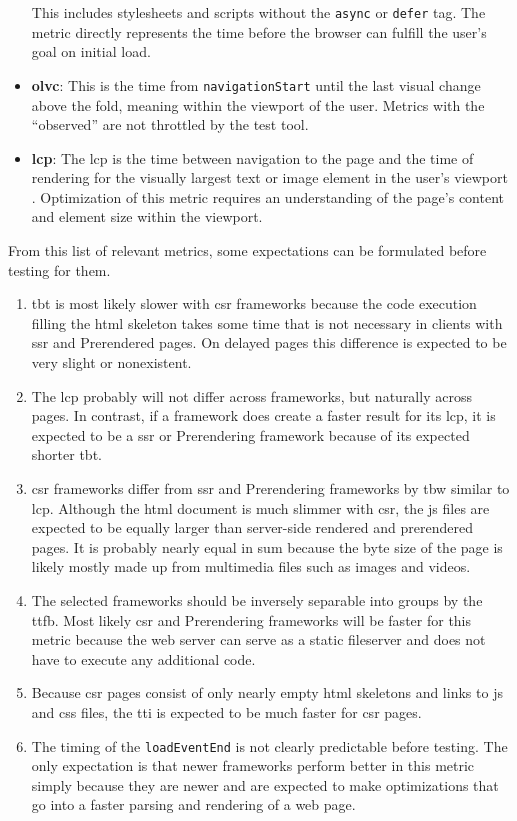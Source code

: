 \documentclass[a4paper, 12pt]{article}
\begin{document}
\begin{itemize}
  This includes stylesheets and scripts without the \verb|async| or \verb|defer| tag.
  The metric directly represents the time before the browser can fulfill the user's goal on initial load.
  \item \textbf{\acrfull{olvc}}: This is the time from \verb|navigationStart| until the last visual change above the fold, meaning within the viewport of the user.
  Metrics with the \enquote{observed} are not throttled by the test tool.
  \item \textbf{\acrfull{lcp}}: The \acrshort{lcp} is the time between navigation to the page and the time of rendering for the visually largest text or image element in the user's viewport \citep{lcpDocumentation}.
  Optimization of this metric requires an understanding of the page's content and element size within the viewport.
\end{itemize}

From this list of relevant metrics, some expectations can be formulated before testing for them.
\begin{enumerate}
  \item \acrshort{tbt} is most likely slower with \acrshort{csr} frameworks because the code execution filling the \acrshort{html} skeleton takes some time that is not necessary in clients with \acrshort{ssr} and Prerendered pages.
  On delayed pages this difference is expected to be very slight or nonexistent.
  \item The \acrshort{lcp} probably will not differ across frameworks, but naturally across pages.
  In contrast, if a framework does create a faster result for its \acrshort{lcp}, it is expected to be a \acrshort{ssr} or Prerendering framework because of its expected shorter \acrshort{tbt}.
  \item \acrshort{csr} frameworks differ from \acrshort{ssr} and Prerendering frameworks by \acrlong{tbw} similar to \acrlong{lcp}.
  Although the \acrshort{html} document is much slimmer with \acrshort{csr}, the \acrshort{js} files are expected to be equally larger than server-side rendered and prerendered pages.
  It is probably nearly equal in sum because the byte size of the page is likely mostly made up from multimedia files such as images and videos. 
  \item The selected frameworks should be inversely separable into groups by the \acrlong{ttfb}.
  Most likely \acrshort{csr} and Prerendering frameworks will be faster for this metric because the web server can serve as a static fileserver and does not have to execute any additional code.
  \item Because \acrshort{csr} pages consist of only nearly empty \acrshort{html} skeletons and links to \acrshort{js} and \acrshort{css} files, the \acrshort{tti} is expected to be much faster for \acrshort{csr} pages.
  \item The timing of the \verb|loadEventEnd| is not clearly predictable before testing.
  The only expectation is that newer frameworks perform better in this metric simply because they are newer and are expected to make optimizations that go into a faster parsing and rendering of a web page.
\end{enumerate}
  
\end{document}
